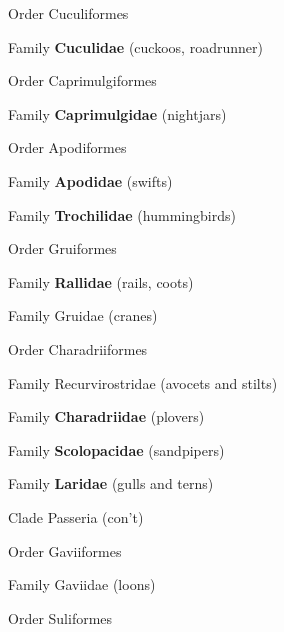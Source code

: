 \documentclass[10pt]{article}
\newlength\mylength
\newcommand*{\growparindent}{\addtolength{\parindent}{\mylength}}
\newcommand*{\reduceparindent}{\addtolength{\parindent}{-1\mylength}}
\begin{document}
\begin{multicols}{2}
\begin{spacing}{1.35}
    	\growparindent
     	Order Cuculiformes
      
	      \growparindent
      
    	  Family \textbf{Cuculidae} (cuckoos, roadrunner)
    	  
    	\reduceparindent
    	
    	Order Caprimulgiformes
    	
    		\growparindent
    		
    		Family \textbf{Caprimulgidae} (nightjars)
    		
    	\reduceparindent

			Order Apodiformes

				\growparindent
				
    		Family \textbf{Apodidae} (swifts)
    		
    		Family \textbf{Trochilidae} (hummingbirds)
    		
    	\reduceparindent
    	
    	Order Gruiformes
    	
    	\growparindent
    	
    		Family \textbf{Rallidae} (rails, coots)
    		
    		Family Gruidae (cranes)
    		
    	\reduceparindent
    	
    	Order Charadriiformes
    	
    		\growparindent
    		
    		Family Recurvirostridae (avocets and stilts)
    		
    		Family \textbf{Charadriidae} (plovers)
    		
    		Family \textbf{Scolopacidae} (sandpipers)
    		
    		Family \textbf{Laridae} (gulls and terns)
    		
\columnbreak

	\reduceparindent

	\reduceparindent

   \reduceparindent
   


Clade Passeria (con't)
    	
	\growparindent
    	Order Gaviiformes
    	
    		\growparindent
    		
    		Family Gaviidae (loons)

      
      \reduceparindent
      
      Order Suliformes
      

\end{spacing}
\end{multicols}
\end{document}
